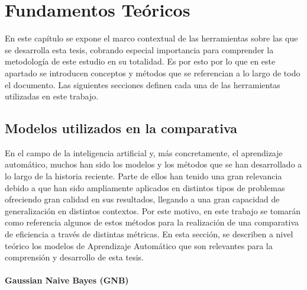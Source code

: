 

\chapter{Fundamentos Teóricos}

En este capítulo se expone el marco contextual de las herramientas sobre las que se desarrolla esta tesis, cobrando especial importancia para comprender la metodología de este estudio en su totalidad. Es por esto por lo que en este apartado se introducen conceptos y métodos que se referencian a lo largo de todo el documento. Las siguientes secciones definen cada una de las herramientas utilizadas en este trabajo.


\section{Modelos utilizados en la comparativa}



En el campo de la inteligencia artificial y, más concretamente, el aprendizaje automático, muchos han sido los modelos y los métodos que se han desarrollado a lo largo de la historia reciente. Parte de ellos han tenido una gran relevancia debido a que han sido ampliamente aplicados en distintos tipos de problemas ofreciendo gran calidad en sus resultados, llegando a una gran capacidad de generalización en distintos contextos. Por este motivo, en este trabajo se tomarán como referencia algunos de estos métodos para la realización de una comparativa de eficiencia a través de distintas métricas. En esta sección, se describen a nivel teórico los modelos de Aprendizaje Automático que son relevantes para la comprensión y desarrollo de esta tesis. 


\subsubsection*{Gaussian Naive Bayes (GNB)}



